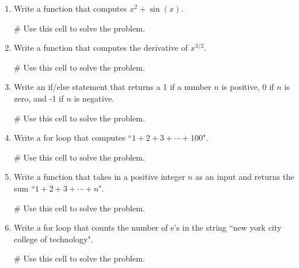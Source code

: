 \documentclass{ximera}
\begin{document}
    \begin{enumerate}
    \item Write a function that computes $x^2+\sin(x)$.
\begin{sageCell}
# Use this cell to solve the problem.
\end{sageCell}

    \item Write a function that computes the derivative of $x^{3/2}$.
\begin{sageCell}
# Use this cell to solve the problem.
\end{sageCell}

    \item Write an if/else statement that returns a 1 if a number $n$ is positive, 0 if $n$ is zero, and -1 if $n$ is negative.
\begin{sageCell}
# Use this cell to solve the problem.
\end{sageCell}

    \item Write a for loop that computes ``$1+2+3+\cdots+100$".
\begin{sageCell}
# Use this cell to solve the problem.
\end{sageCell}

    \item Write a function that takes in a positive integer $n$ as an input and returns the sum ``$1+2+3+\cdots+n$".
\begin{sageCell}
# Use this cell to solve the problem.
\end{sageCell}

    \item Write a for loop that counts the number of e's in the string ``new york city college of technology".
\begin{sageCell}
# Use this cell to solve the problem.
\end{sageCell}

\end{enumerate}
\end{document}
